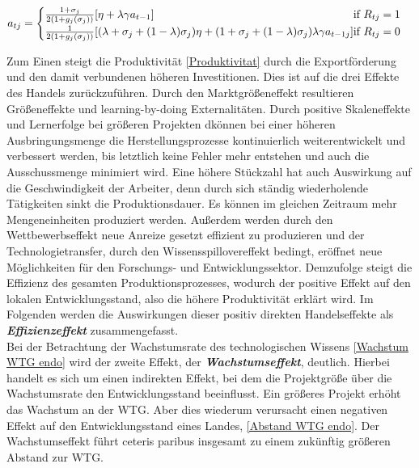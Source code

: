 	\begin{equation}
		a_{tj}=\begin{cases}\frac{1+\sigma_j}{2(1+g_j(\sigma_j))}[\eta+\lambda \gamma a_{t-1}] \hfill\text{if  } R_{tj}=1 \\
		\frac{1}{2(1+g_j(\sigma_j))}[(\lambda+\sigma_j+(1-\lambda)\sigma_j)\eta+(1+\sigma_j+(1-\lambda)\sigma_j)\lambda\gamma a_{t-1 j}] \hfill\text{if   }R_{tj}=0
		\end{cases}\label{Abstand WTG endo}
	\end{equation}


Zum Einen steigt die Produktivität \eqref{Produktivitat} durch die Exportförderung und den damit verbundenen höheren Investitionen. Dies ist auf die drei Effekte des Handels zurückzuführen. Durch den Marktgrö{\ss}eneffekt resultieren Grö{\ss}eneffekte und learning-by-doing Externalitäten. Durch positive Skaleneffekte und Lernerfolge bei grö{\ss}eren Projekten dkönnen bei einer höheren Ausbringungsmenge die Herstellungsprozesse kontinuierlich weiterentwickelt und verbessert werden, bis letztlich keine Fehler mehr entstehen und auch die Ausschussmenge minimiert wird. Eine höhere Stückzahl hat auch Auswirkung auf die Geschwindigkeit der Arbeiter, denn durch sich ständig wiederholende Tätigkeiten sinkt die Produktionsdauer. Es können im gleichen Zeitraum mehr Mengeneinheiten produziert werden. Au{\ss}erdem werden durch den Wettbewerbseffekt neue Anreize gesetzt effizient zu produzieren und der Technologietransfer, durch den Wissensspillovereffekt bedingt, eröffnet neue Möglichkeiten für den Forschungs- und Entwicklungssektor. Demzufolge steigt die Effizienz des gesamten Produktionsprozesses, wodurch der positive Effekt auf den lokalen Entwicklungsstand, also die höhere Produktivität erklärt wird. Im Folgenden werden die Auswirkungen dieser positiv direkten Handelseffekte als \textbf{\textit{Effizienzeffekt}} zusammengefasst. \\


Bei der Betrachtung der Wachstumsrate des technologischen Wissens \eqref{Wachstum WTG endo} wird der zweite Effekt, der \textbf{\textit{Wachstumseffekt}}, deutlich. Hierbei handelt es sich um einen indirekten Effekt, bei dem die Projektgrö{\ss}e über die Wachstumsrate den Entwicklungsstand beeinflusst. Ein grö{\ss}eres Projekt erhöht das Wachstum an der WTG. Aber dies wiederum verursacht einen negativen Effekt auf den Entwicklungsstand eines Landes, \eqref{Abstand WTG endo}. Der Wachstumseffekt führt ceteris paribus insgesamt zu einem zukünftig grö{\ss}eren Abstand zur WTG.\\


